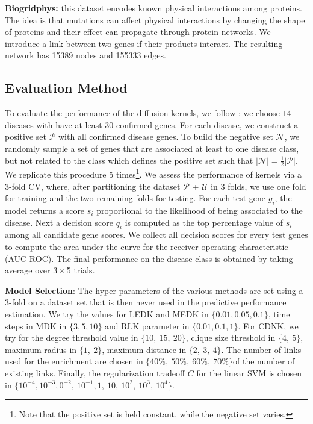 \textbf{Biogridphys:} this dataset encodes known physical interactions
among proteins. The idea is that mutations can affect physical interactions by
changing the shape of proteins and their effect can propagate through protein
networks. We introduce a link between two genes if their products interact. The resulting network has 15389 nodes and 155333 edges.

\subsection{Evaluation Method}

To evaluate the performance of the diffusion kernels, we follow
\cite{proceeding3}: we choose $14$ diseases with have at least $30$ confirmed
genes. For each disease, we construct a positive set $\mathcal{P}$ with all
confirmed disease genes. To build the negative set $\mathcal{N}$, we randomly
sample a set of genes that are associated at least to one disease class, but
not related to the class which defines the positive set such that $\vert
\mathcal{N} \vert = \frac{1}{2} \vert \mathcal{P} \vert$. We replicate this
procedure 5 times\footnote{Note that the positive set is held constant, while
the negative set varies.}. We assess the performance of kernels via a 3-fold
CV, where, after partitioning  the dataset $\mathcal{P}$ + $\mathcal{U}$ in 3
folds, we use one fold for training and the two remaining folds for testing.
For each test gene $g_i$, the model returns a score $s_i$ proportional to the
likelihood of being associated to the disease. Next a decision score $q_i$ is
computed as the top percentage value of $s_i$ among all candidate gene scores.
We collect all decision scores for every test genes to compute the area under
the curve for the receiver operating characteristic (AUC-ROC).  The final
performance on the disease class is obtained by taking average over $3\times$5
trials.


\textbf{Model Selection}: The hyper parameters of the various methods are
set using a 3-fold on a dataset set that is then never used in the predictive
performance estimation. We try the values for LEDK and MEDK in $\lbrace  0.01,
0.05, 0.1 \rbrace$, time steps in MDK in $\lbrace 3, 5, 10 \rbrace$ and RLK
parameter in $\lbrace 0.01, 0.1, 1 \rbrace$. For CDNK, we try for the degree
threshold value in $\lbrace 10,\ 15,\ 20 \rbrace$, clique size threshold in
$\lbrace 4,\ 5 \rbrace$, maximum radius in $\lbrace 1,\ 2 \rbrace$, maximum
distance in $\lbrace 2,\ 3,\ 4 \rbrace$. 
The number of links used for the enrichment are chosen in $\lbrace 40\%,\ 50\%,\ 60\%,\ 70\% \rbrace$of the number of existing links. 
Finally, the regularization tradeoff $C$ for the linear SVM is chosen in $\lbrace 10^{-4}, 10^{-3}, 0^{-2},\ 10^{-1}, 1,\ 10,\ 10^2, \ 10^3,\ 10^4 \rbrace$.
